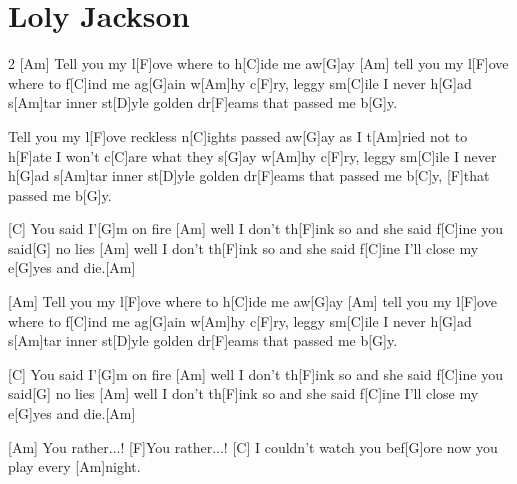 \section{Loly Jackson}
\begin{guitar}
\begin{multicols}{2}
[Am]{}  Tell you my l[F]ove where to h[C]ide me aw[G]ay
 [Am]{}  tell you my l[F]ove where to f[C]ind me ag[G]ain
   w[Am]hy c[F]ry, leggy sm[C]ile I never h[G]ad
   s[Am]tar inner st[D]yle
   golden dr[F]eams that passed me b[G]y.


   Tell you my l[F]ove reckless n[C]ights passed aw[G]ay
   as I t[Am]ried not to h[F]ate
   I won't c[C]are what they s[G]ay
   w[Am]hy c[F]ry, leggy sm[C]ile I never h[G]ad
   s[Am]tar inner st[D]yle
   golden dr[F]eams that passed me b[C]y, [F]that passed me b[G]y.


 [C]{}  You said I'[G]m on fire
 [Am]{}  well I don't th[F]ink so and she said f[C]ine
   you said[G] no lies
 [Am]{}  well I don't th[F]ink so and she said f[C]ine
   I'll close my e[G]yes and die.[Am]{}


 [Am]{}  Tell you my l[F]ove where to h[C]ide me aw[G]ay
 [Am]{}  tell you my l[F]ove where to f[C]ind me ag[G]ain
   w[Am]hy c[F]ry, leggy sm[C]ile I never h[G]ad
   s[Am]tar inner st[D]yle
   golden dr[F]eams that passed me b[G]y.


 [C]{}  You said I'[G]m on fire
 [Am]{}  well I don't th[F]ink so and she said f[C]ine
   you said[G] no lies
 [Am]{}  well I don't th[F]ink so and she said f[C]ine
   I'll close my e[G]yes and die.[Am]{}


 [Am]{}  You rather...! [F]You rather...!
 [C]{}  I couldn't watch you bef[G]ore
   now you play every [Am]night.
\end{multicols}
\end{guitar}

